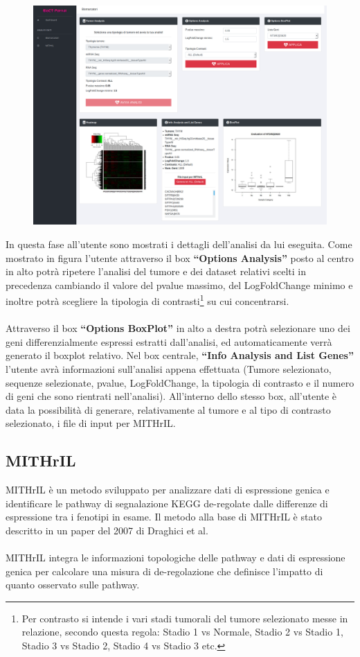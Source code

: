 \documentclass[10pt,a4paper]{report}
\newcommand{\virgolette}[1]{``#1''}
\begin{document}
\begin{figure}[H]
\centering%
\vspace{1ex}%
\includegraphics[scale=0.18]{Biomarcatori_1.png} 
\end{figure}
\newpage
In questa fase all’utente sono mostrati i dettagli dell’analisi da lui eseguita. Come mostrato in figura l’utente attraverso il box \textbf{\virgolette{Options Analysis}} posto al centro in alto potrà ripetere l’analisi del tumore e dei dataset relativi scelti in precedenza cambiando il valore del pvalue massimo, del LogFoldChange minimo e inoltre potrà scegliere la tipologia di contrasti\footnote{Per contrasto si intende  i vari stadi tumorali del tumore selezionato messe in relazione, secondo questa regola:  Stadio 1 vs Normale, Stadio 2 vs Stadio 1, Stadio 3 vs Stadio 2, Stadio 4 vs Stadio 3 etc.} su cui concentrarsi. \\\\ Attraverso il box \textbf{“Options BoxPlot”} in alto a destra potrà selezionare uno dei geni differenzialmente espressi estratti dall'analisi, ed automaticamente verrà generato il boxplot relativo. \newline Nel box centrale, \textbf{\virgolette{Info Analysis and List Genes}} l’utente avrà informazioni sull’analisi appena effettuata (Tumore selezionato, sequenze selezionate, pvalue, LogFoldChange, la tipologia di contrasto e il numero di geni che sono rientrati nell’analisi). All'interno dello stesso box, all'utente è data la possibilità di generare, relativamente al tumore e al tipo di contrasto selezionato, i file di input per MITHrIL.
\newpage
\subsection{MITHrIL}
MITHrIL è un metodo sviluppato per analizzare dati di espressione genica e identificare le pathway di segnalazione KEGG de-regolate dalle differenze di espressione tra i fenotipi in esame. Il metodo alla base di MITHrIL è stato descritto in un paper del 2007 di Draghici et al. \\\\ MITHrIL integra le informazioni topologiche delle pathway e dati di espressione genica per calcolare una misura di de-regolazione che definisce l’impatto di quanto osservato sulle
pathway. 
\end{document}
